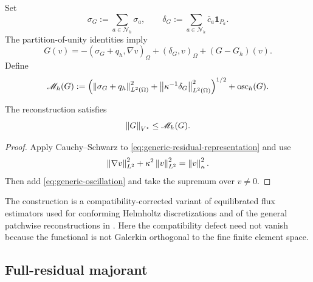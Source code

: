 Set
\begin{equation}
\label{eq:generic-assembled-flux}
  \sigma_G:=\sum_{a\in\mathcal N_h}\sigma_a,
  \qquad
  \delta_G:=\sum_{a\in\mathcal N_h}\bar c_a\mathbf1_{P_a}.
\end{equation}
The partition-of-unity identities imply
\begin{equation}
\label{eq:generic-residual-representation}
  G(v)
  =-(\sigma_G+q_h,\nabla v)_\Omega
    +(\delta_G,v)_\Omega
    +(G-G_h)(v).
\end{equation}
Define
\begin{equation}
\label{eq:generic-majorant}
  \mathscr M_h(G)
  :=\left(
      \left\lVert \sigma_G+q_h\right\rVert_{L^2(\Omega)}^2
      +\left\lVert \kappa^{-1}\delta_G\right\rVert_{L^2(\Omega)}^2
    \right)^{1/2}
    +\operatorname{osc}_h(G).
\end{equation}

\begin{theorem}
\label{thm:generic-equilibrated}
The reconstruction satisfies
\begin{equation}
\label{eq:generic-majorant-reliability}
  \left\lVert G\right\rVert_{V^\star}\leq\mathscr M_h(G).
\end{equation}
\end{theorem}

\begin{proof}
Apply Cauchy--Schwarz to \eqref{eq:generic-residual-representation} and use
\[
  \left\lVert \nabla v\right\rVert_{L^2}^2+\kappa^2\left\lVert v\right\rVert_{L^2}^2
  =\left\lVert v\right\rVert_\kappa^2.
\]
Then add \eqref{eq:generic-oscillation} and take the supremum over
$v\neq0$.
\end{proof}

The construction is a compatibility-corrected variant of equilibrated
flux estimators used for conforming Helmholtz discretizations
\cite{ChaumontFreletErnVohralik2021} and of the general patchwise
reconstructions in \cite{ErnVohralik2015}.  Here the compatibility defect
need not vanish because the functional is not Galerkin orthogonal to the
fine finite element space.

\subsection{Full-residual majorant}
\label{sec:full-residual-majorant}


